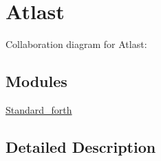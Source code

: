 \hypertarget{group__Atlast}{}\section{Atlast}
\label{group__Atlast}
Collaboration diagram for Atlast\+:
\subsection*{Modules}
\begin{DoxyCompactItemize}
\item 
\hyperlink{group__Standard__forth}{Standard\+\_\+forth}
\end{DoxyCompactItemize}


\subsection{Detailed Description}
